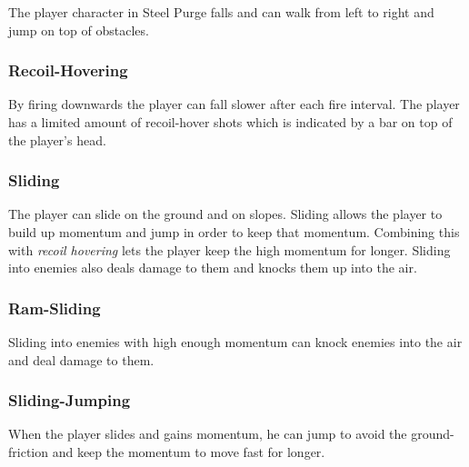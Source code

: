 \documentclass[../Main.tex]{subfiles}
\begin{document}
The player character in Steel Purge falls and can walk from left to right and jump on top of obstacles.

\subsubsection{Recoil-Hovering}

By firing downwards the player can fall slower after each fire interval. The player has a limited amount of recoil-hover shots which is indicated by a bar on top of the player's head. 

\subsubsection{Sliding}

The player can slide on the ground and on slopes. Sliding allows the player to build up momentum and jump in order to keep that momentum. Combining this with \emph{recoil hovering} lets the player keep the high momentum for longer. Sliding into enemies also deals damage to them and knocks them up into the air. 

\subsubsection{Ram-Sliding}

Sliding into enemies with high enough momentum can knock enemies into the air and deal damage to them. 

\subsubsection{Sliding-Jumping}

When the player slides and gains momentum, he can jump to avoid the ground-friction and keep the momentum to move fast for longer.
\end{document}
